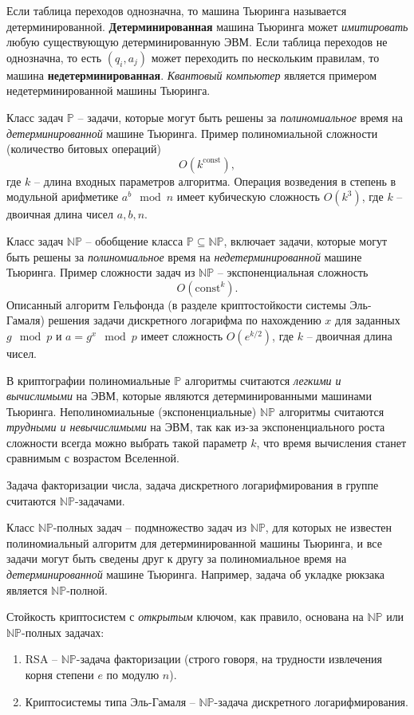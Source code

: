 \documentclass[10pt,a4paper]{book}
\newcommand{\set}[1]{\mathbb{#1}}
\begin{document}
Если таблица переходов однозначна, то машина Тьюринга называется детерминированной. \textbf{Детерминированная} машина Тьюринга может \emph{имитировать} любую существующую детерминированную ЭВМ. Если таблица переходов не однозначна, то есть $(q_i, a_j)$ может переходить по нескольким правилам, то машина \textbf{недетерминированная}. \emph{Квантовый компьютер} является примером недетерминированной машины Тьюринга.

Класс задач $\set{P}$ -- задачи, которые могут быть решены за \emph{полиномиальное} время на \emph{детерминированной} машине Тьюринга. Пример полиномиальной сложности (количество битовых операций)
    \[ O(k^{\textrm{const}}), \]
где $k$ -- длина входных параметров алгоритма. Операция возведения в степень в модульной арифметике $a^b \mod n$ имеет кубическую сложность $O(k^3)$, где $k$ -- двоичная длина чисел $a,b,n$.

Класс задач $\set{NP}$ -- обобщение класса $\set{P} \subseteq \set{NP}$, включает задачи, которые могут быть решены за \emph{полиномиальное} время на \emph{недетерминированной} машине Тьюринга. Пример сложности задач из $\set{NP}$ -- экспоненциальная сложность
    \[ O(\textrm{const}^k). \]
Описанный алгоритм Гельфонда (в разделе криптостойкости системы Эль-Гамаля) решения задачи дискретного логарифма по нахождению $x$ для заданных $g \mod p$ и $a = g^x \mod p$ имеет сложность $O(e^{k/2})$, где $k$ -- двоичная длина чисел.

В криптографии полиномиальные $\set{P}$ алгоритмы считаются \emph{легкими и вычислимыми} на ЭВМ, которые являются детерминированными машинами Тьюринга. Неполиномиальные (экспоненциальные) $\set{NP}$ алгоритмы считаются \emph{трудными и невычислимыми} на ЭВМ, так как из-за экспоненциального роста сложности всегда можно выбрать такой параметр $k$, что время вычисления станет сравнимым с возрастом Вселенной.

Задача факторизации числа, задача дискретного логарифмирования в группе считаются $\set{NP}$-задачами.

Класс $\set{NP}$-полных задач -- подмножество задач из $\set{NP}$, для которых не известен полиномиальный алгоритм для детерминированной машины Тьюринга, и все задачи могут быть сведены друг к другу за полиномиальное время на \emph{детерминированной} машине Тьюринга. Например, задача об укладке рюкзака является $\set{NP}$-полной.

Стойкость криптосистем с \emph{открытым} ключом, как правило, основана на $\set{NP}$ или $\set{NP}$-полных задачах:
\begin{enumerate}
    \item RSA -- $\set{NP}$-задача факторизации (строго говоря, на трудности извлечения корня степени $e$ по модулю $n$).
    \item Криптосистемы типа Эль-Гамаля -- $\set{NP}$-задача дискретного логарифмирования.
\end{enumerate}
\end{document}
